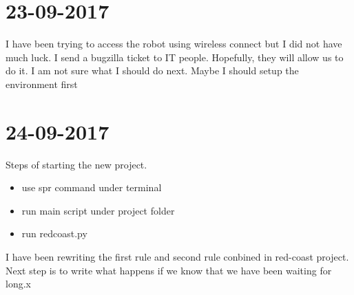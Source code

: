 \documentclass{article}
\begin{document}
 


\begin{abstract} 
\end{abstract} 

\section{23-09-2017}
I have been trying to access the robot using wireless connect but I did not have much luck.
I send a bugzilla ticket to IT people. Hopefully, they will allow us to do it.
I am not sure what I should do next. Maybe I should setup the environment first

\section{24-09-2017}
Steps of starting the new project.
\begin{itemize}
\item use spr command under terminal
\item run main script under project folder
\item run redcoast.py 
\end{itemize}

I have been rewriting the first rule and second rule conbined in red-coast project.
Next step is to write what happens if we know that we have been waiting for long.x
\subsection{}

\nocite{langley00}



\end{document}
